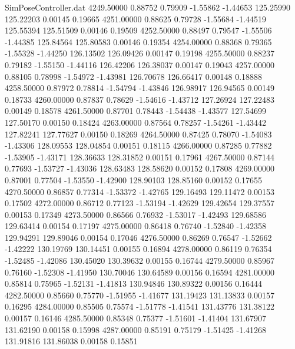 \begin{filecontents}{SimPoseController.dat}
4249.50000    0.88752    0.79909    -1.55862   -1.44653  125.25990  125.22203    0.00145    0.19665
4251.00000    0.88625    0.79728    -1.55684   -1.44519  125.55394  125.51509    0.00146    0.19509
4252.50000    0.88497    0.79547    -1.55506   -1.44385  125.84564  125.80583    0.00146    0.19354
4254.00000    0.88368    0.79365    -1.55328   -1.44250  126.13502  126.09426    0.00147    0.19198
4255.50000    0.88237    0.79182    -1.55150   -1.44116  126.42206  126.38037    0.00147    0.19043
4257.00000    0.88105    0.78998    -1.54972   -1.43981  126.70678  126.66417    0.00148    0.18888
4258.50000    0.87972    0.78814    -1.54794   -1.43846  126.98917  126.94565    0.00149    0.18733
4260.00000    0.87837    0.78629    -1.54616   -1.43712  127.26924  127.22483    0.00149    0.18578
4261.50000    0.87701    0.78443    -1.54438   -1.43577  127.54699  127.50170    0.00150    0.18424
4263.00000    0.87564    0.78257    -1.54261   -1.43442  127.82241  127.77627    0.00150    0.18269
4264.50000    0.87425    0.78070    -1.54083   -1.43306  128.09553  128.04854    0.00151    0.18115
4266.00000    0.87285    0.77882    -1.53905   -1.43171  128.36633  128.31852    0.00151    0.17961
4267.50000    0.87144    0.77693    -1.53727   -1.43036  128.63483  128.58620    0.00152    0.17808
4269.00000    0.87001    0.77504    -1.53550   -1.42900  128.90103  128.85160    0.00152    0.17655
4270.50000    0.86857    0.77314    -1.53372   -1.42765  129.16493  129.11472    0.00153    0.17502
4272.00000    0.86712    0.77123    -1.53194   -1.42629  129.42654  129.37557    0.00153    0.17349
4273.50000    0.86566    0.76932    -1.53017   -1.42493  129.68586  129.63414    0.00154    0.17197
4275.00000    0.86418    0.76740    -1.52840   -1.42358  129.94291  129.89046    0.00154    0.17046
4276.50000    0.86269    0.76547    -1.52662   -1.42222  130.19769  130.14451    0.00155    0.16894
4278.00000    0.86119    0.76354    -1.52485   -1.42086  130.45020  130.39632    0.00155    0.16744
4279.50000    0.85967    0.76160    -1.52308   -1.41950  130.70046  130.64589    0.00156    0.16594
4281.00000    0.85814    0.75965    -1.52131   -1.41813  130.94846  130.89322    0.00156    0.16444
4282.50000    0.85660    0.75770    -1.51955   -1.41677  131.19423  131.13833    0.00157    0.16295
4284.00000    0.85505    0.75574    -1.51778   -1.41541  131.43776  131.38122    0.00157    0.16146
4285.50000    0.85348    0.75377    -1.51601   -1.41404  131.67907  131.62190    0.00158    0.15998
4287.00000    0.85191    0.75179    -1.51425   -1.41268  131.91816  131.86038    0.00158    0.15851

\end{filecontents}

